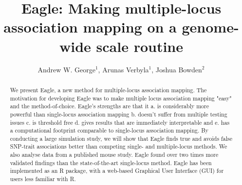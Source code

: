 \documentclass{article}
\begin{document}
\title{Eagle: Making multiple-locus association mapping on a genome-wide scale routine}
\author{Andrew W. George$^1$, Arunas Verbyla$^1$, Joshua Bowden$^2$}

\maketitle





\begin{abstract}


We present Eagle, a new method for multiple-locus association mapping. The
motivation for developing Eagle was to make multiple locus association mapping "easy" and the method-of-choice. 
Eagle's strengths are that it a. is considerably more powerful than single-locus association mapping b. doesn't suffer from multiple testing issues c. is threshold free d. gives results that are immediately interpretable and e. has a computational footprint comparable to single-locus association mapping. 
By conducting a large simulation study, we will show that Eagle finds true and avoids false SNP-trait associations better than competing single- and 
multiple-locus methods. We also analyse data from a published mouse study. Eagle found over two times more validated findings than the state-of-the-art 
single-locus method. 
Eagle has been implemented as an R package, with a web-based Graphical User Interface (GUI) for users less familiar with R.

\end{abstract}
\end{document}
